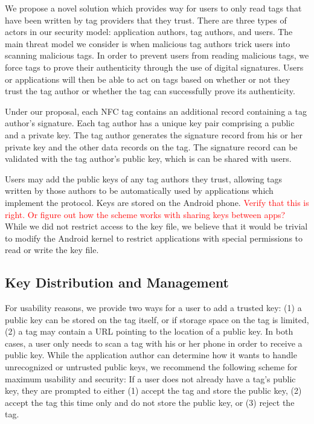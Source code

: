 \documentclass[12pt]{article}
\newcommand\TODO[1]{\textcolor{red}{#1}}
\begin{document}
We propose a novel solution which provides way for users to only read tags that have been written by tag providers that they trust.
There are three types of actors in our security model: application authors, tag authors, and users.
The main threat model we consider is when malicious tag authors trick users into scanning malicious tags.
In order to prevent users from reading malicious tags, we force tags to prove their authenticity through the use of digital signatures.
Users or applications will then be able to act on tags based on whether or not they trust the tag author or whether the tag can successfully prove its authenticity.

Under our proposal, each NFC tag contains an additional record containing a tag author's signature.
Each tag author has a unique key pair comprising a public and a private key.
The tag author generates the signature record from his or her private key and the other data records on the tag.
The signature record can be validated with the tag author's public key, which is can be shared with users.

Users may add the public keys of any tag authors they trust, allowing tags written by those authors to be automatically used by applications which implement the protocol.
Keys are stored on the Android phone.
\TODO{Verify that this is right. Or figure out how the scheme works with sharing keys between apps?}
While we did not restrict access to the key file, we believe that it would be trivial to modify the Android kernel to restrict applications with special permissions to read or write the key file.

\subsection{Key Distribution and Management}
% 
% 

For usability reasons, we provide two ways for a user to add a trusted key: (1) a public key can be stored on the tag itself, or if storage space on the tag is limited, (2) a tag may contain a URL pointing to the location of a public key.
In both cases, a user only needs to scan a tag with his or her phone in order to receive a public key.
While the application author can determine how it wants to handle unrecognized or untrusted public keys, we recommend the following scheme for maximum usability and security:
If a user does not already have a tag's public key, they are prompted to either (1) accept the tag and store the public key, (2) accept the tag this time only and do not store the public key, or (3) reject the tag.
\end{document}
